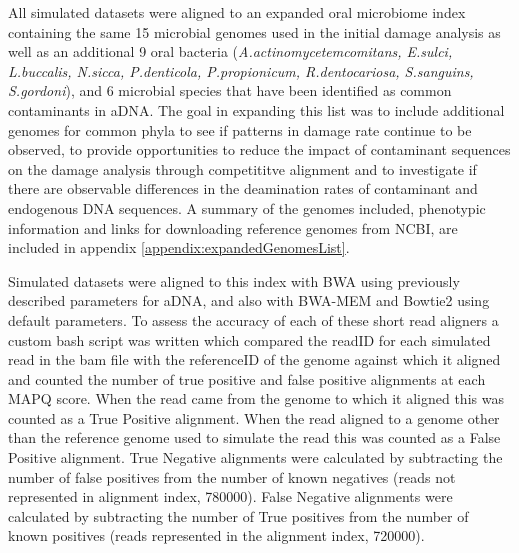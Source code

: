 \documentclass[12pt, a4paper]{article}
\begin{document}
All simulated datasets were aligned to an expanded oral microbiome index containing the same 15 microbial genomes used in the initial damage analysis as well as an additional 9 oral bacteria (\textit{A.actinomycetemcomitans, E.sulci, L.buccalis, N.sicca, P.denticola, P.propionicum, R.dentocariosa, S.sanguins, S.gordoni}), and 6 microbial species that have been identified as common contaminants in aDNA. 
The goal in expanding this list was to include additional genomes for common phyla to see if patterns in damage rate continue to be observed, to provide opportunities to reduce the impact of contaminant sequences on the damage analysis through competititve alignment and to investigate if there are observable differences in the deamination rates of contaminant and endogenous DNA sequences.
A summary of the genomes included, phenotypic information and links for downloading reference genomes from NCBI, are included in appendix \ref{appendix:expandedGenomesList}.

Simulated datasets were aligned to this index with BWA using previously described parameters for aDNA, and also with BWA-MEM and Bowtie2 using default parameters. 
To assess the accuracy of each of these short read aligners a custom bash script was written which compared the readID for each simulated read in the bam file with the referenceID of the genome against which it aligned and counted the number of true positive and false positive alignments at each MAPQ score.
When the read came from the genome to which it aligned this was counted as a True Positive alignment.
When the read aligned to a genome other than the reference genome used to simulate the read this was counted as a False Positive alignment. 
True Negative alignments were calculated by subtracting the number of false positives from the number of known negatives (reads not represented in alignment index, 780000).
False Negative alignments were calculated by subtracting the number of True positives from the number of known positives (reads represented in the alignment index, 720000).
\\
\end{document}
